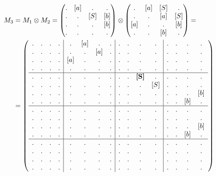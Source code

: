 \begin{example}
\begin{align}
M_3 &= M_1 \otimes M_2 = 
\begin{pmatrix} 
. & [a] & . & . \\
. & . & [S] & [b] \\
. & . & . & [b] \\
. & . & . & . 
\end{pmatrix}
\otimes 
\begin{pmatrix} 
. & [a] & [S] & . \\
. & . & [a] & [S] \\
[a] & . & . & [b] \\
. & . & [b] & . 
\end{pmatrix}
=\notag\\
&=
\left(\begin{array}{c c c c | c c c c | c c c c | c c c c } 
. & . & . & .  &  . & [a] & . & .  &  . & . & . & .    &  . & . & . & .   \\
. & . & . & .  &  . & . & [a] & .  &  . & . & . & .    &  . & . & . & .   \\
. & . & . & .  &  [a] & . & . & .  &  . & . & . & .    &  . & . & . & .   \\
. & . & . & .  &  . & . & . & .    &  . & . & . & .    &  . & . & . & .   \\
\hline
. & . & . & .  &  . & . & . & .    &  . & . & \textbf{[S]} & .    &  . & . & . & .   \\
. & . & . & .  &  . & . & . & .    &  . & . & .   & [S]  &  . & . & . & .   \\
. & . & . & .  &  . & . & . & .    &  . & . & .   & .    &  . & . & . & [b] \\
. & . & . & .  &  . & . & . & .    &  . & . & .   & .    &  . & . & [b] & . \\
\hline
. & . & . & .  &  . & . & . & .    &  . & . & . & .    &  . & . & . & .   \\
. & . & . & .  &  . & . & . & .    &  . & . & . & .    &  . & . & . & .   \\
. & . & . & .  &  . & . & . & .    &  . & . & . & .    &  . & . & . & [b] \\
. & . & . & .  &  . & . & . & .    &  . & . & . & .    &  . & . & [b] & . \\
\hline
. & . & . & .  &  . & . & . & .    &  . & . & . & .    &  . & . & . & .   \\
. & . & . & .  &  . & . & . & .    &  . & . & . & .    &  . & . & . & .   \\
. & . & . & .  &  . & . & . & .    &  . & . & . & .    &  . & . & . & .   \\
. & . & . & .  &  . & . & . & .    &  . & . & . & .    &  . & . & . & . 
\end{array}\right)
\end{align}


\end{example}
